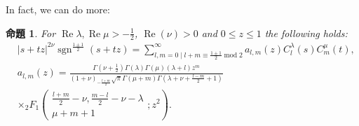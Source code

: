 \documentclass[pdf,notes]{beamer}
\newcommand{\tmop}[1]{\ensuremath{\operatorname{#1}}}
\newtheorem{prop}{命題}
\begin{document}
\begin{frame}
	In fact, we can do more:
	\begin{prop}
		  \label{thm:4}For $\tmop{Re} \lambda, \tmop{Re} \mu > - \frac{1}{2}$,
		    $\tmop{Re} (\nu) > 0$ and $0 \leqslant z \leqslant 1$ the following holds:
		      \begin{eqnarray}
			          & | s + t z |^{2 \nu} \tmop{sgn}^{\frac{1 \pm 1}{2}} (s + t z) = \sum_{l,
					      m = 0 \mid l + m \equiv \frac{1 \pm 1}{2} \tmop{mod} 2}^{\infty} a_{l, m}
					          (z) C_l^{\lambda} (s) C_m^{\mu} (t), &  \nonumber\\
						      & a_{l, m} (z) = \frac{\Gamma \left( \nu + \frac{1}{2} \right) \Gamma
						      (\lambda) \Gamma (\mu) (\lambda + l) z^m }{(1 + \nu)_{- \frac{l + m}{2}} \sqrt{\pi} \Gamma
										      (\mu + m) \Gamma \left( \lambda + \nu + \frac{l - m}{2} + 1 \right)}&\nonumber
										      \\&\times{}_2 F_1 \left( \begin{array}{c}
								        \frac{l + m}{2} - \nu, \frac{m - l}{2} - \nu - \lambda\\
									      \mu + m + 1
									          \end{array} ; z^2 \right). & 
										          \nonumber
											    \end{eqnarray}
										    \end{prop}
\end{frame}
\end{document}
